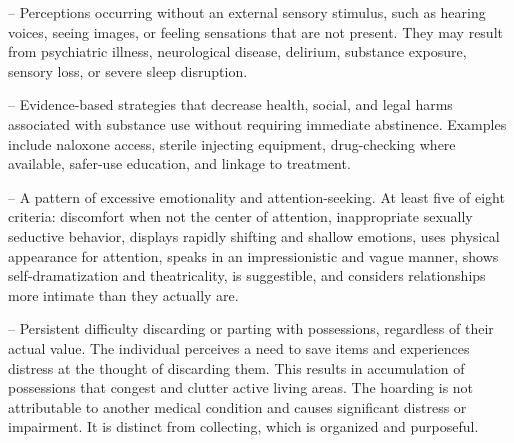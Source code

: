 -- Perceptions occurring without an external sensory stimulus, such as hearing voices, seeing images, or feeling sensations that are not present. They may result from psychiatric illness, neurological disease, delirium, substance exposure, sensory loss, or severe sleep disruption.

-- Evidence-based strategies that decrease health, social, and legal harms associated with substance use without requiring immediate abstinence. Examples include naloxone access, sterile injecting equipment, drug-checking where available, safer-use education, and linkage to treatment.

-- A pattern of excessive emotionality and attention-seeking. At least five of eight criteria: discomfort when not the center of attention, inappropriate sexually seductive behavior, displays rapidly shifting and shallow emotions, uses physical appearance for attention, speaks in an impressionistic and vague manner, shows self-dramatization and theatricality, is suggestible, and considers relationships more intimate than they actually are.

-- Persistent difficulty discarding or parting with possessions, regardless of their actual value. The individual perceives a need to save items and experiences distress at the thought of discarding them. This results in accumulation of possessions that congest and clutter active living areas. The hoarding is not attributable to another medical condition and causes significant distress or impairment. It is distinct from collecting, which is organized and purposeful.

